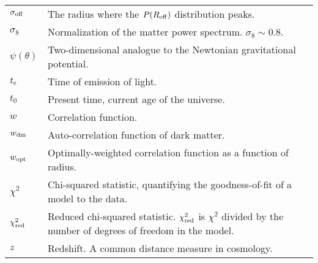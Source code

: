 \begin{tabular}{p{0.6in}p{5.8in}}
$\sigma_{\rm off}$ & The radius where the $P(R_{\rm off})$ distribution peaks. \\
$\sigma_8$ & Normalization of the matter power spectrum.  $\sigma_8 \sim 0.8$. \\
$\psi(\theta)$ & Two-dimensional analogue to the Newtonian gravitational potential. \\
$t_{\rm e}$ & Time of emission of light. \\
$t_0$ & Present time, current age of the universe. \\
$w$ & Correlation function. \\
$w_{\rm dm}$ & Auto-correlation function of dark matter. \\
$w_{\rm opt}$ & Optimally-weighted correlation function as a function of radius. \\
$\chi^2$ & Chi-squared statistic, quantifying the goodness-of-fit of a model to the data. \\
$\chi^2_{\rm red}$ & Reduced chi-squared statistic. $\chi^2_{\rm red}$ is $\chi^2$ divided by the number of degrees of freedom in the model. \\
$z$ & Redshift. A common distance measure in cosmology. \\

\end{tabular}



% 
